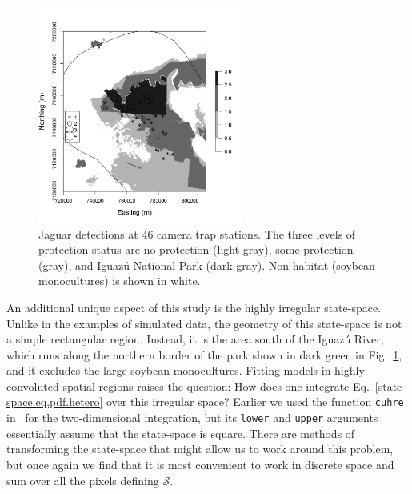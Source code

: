 \begin{figure}%
\centering
\includegraphics[width=0.6\textwidth]{Ch11-Statespace/figs/jaguarCountMap}
\caption{Jaguar detections at 46 camera trap stations. The three levels of
  protection status are no protection (light gray), some protection
  (gray), and Iguaz\'{u} National Park (dark gray). Non-habitat
  (soybean monocultures) is shown in white. }
\label{state-space.fig.jaguarCts}
\end{figure}

An additional unique aspect of this study is the highly irregular
state-space. Unlike in the examples of simulated data, the
geometry of this state-space is not a simple rectangular
region. Instead, it is the
area south of the Iguaz\'{u} River, which runs along the northern border
of the park shown in dark green in
Fig.~\ref{state-space.fig.jaguarCts}, and it excludes the large
soybean monocultures.
Fitting models in highly convoluted spatial regions raises
the question: How does one integrate
Eq.~\ref{state-space.eq.pdf.hetero} over this irregular space? Earlier we used the function \verb+cuhre+ in
\R~for the two-dimensional integration, but its \verb+lower+ and
\verb+upper+ arguments essentially assume that the state-space is
square. There are methods of transforming the state-space that might
allow us to work around this problem, but once again we find that it
is most convenient to work in discrete space and sum over all the pixels defining
$\mathcal{S}$.

